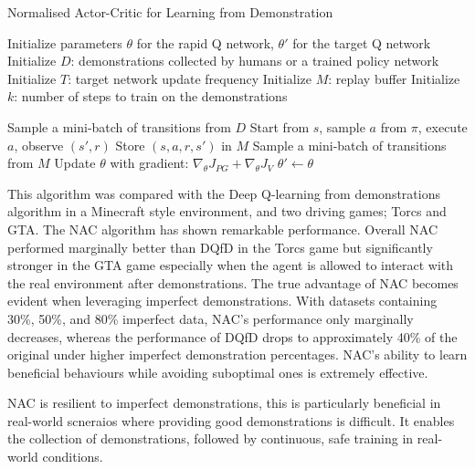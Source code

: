 \begin{algorithm}
\label{algo:nac-imperfect-demos}
\caption{Normalised Actor-Critic for Learning from Demonstration~\cite{fyp14-rl-imperfect-demos}}
\begin{algorithmic}[1] %
\State Initialize parameters $\theta$ for the rapid Q network, $\theta'$ for the target Q network
\State Initialize $D$: demonstrations collected by humans or a trained policy network
\State Initialize $T$: target network update frequency
\State Initialize $M$: replay buffer
\State Initialize $k$: number of steps to train on the demonstrations

        \State Sample a mini-batch of transitions from $D$
    \Else
        \State Start from $s$, sample $a$ from $\pi$, execute $a$, observe $(s',r)$
        \State Store $(s, a, r, s')$ in $M$
        \State Sample a mini-batch of transitions from $M$
    \EndIf
    \State Update $\theta$ with gradient: $\nabla_\theta J_{PG} + \nabla_\theta J_V$
        \State $\theta' \gets \theta$
    \EndIf
\EndFor
\end{algorithmic}
\end{algorithm}

This algorithm was compared with the Deep Q-learning from demonstrations algorithm \cite{deepQLearningFromDemo} in a Minecraft style environment, and two driving games; Torcs and GTA.
The NAC algorithm has shown remarkable performance.
Overall NAC performed marginally better than DQfD in the Torcs game but significantly stronger in the GTA game especially when the agent is allowed to interact with the real environment after demonstrations.
The true advantage of NAC becomes evident when leveraging imperfect demonstrations.
With datasets containing 30\%, 50\%, and 80\% imperfect data, NAC's performance only marginally decreases, whereas the performance of DQfD drops to approximately 40\% of the original under higher imperfect demonstration percentages.
NAC's ability to learn beneficial behaviours while avoiding suboptimal ones is extremely effective.

NAC is resilient to imperfect demonstrations, this is particularly beneficial in real-world scneraios where providing good demonstrations is difficult.
It enables the collection of demonstrations, followed by continuous, safe training in real-world conditions. \\\\


